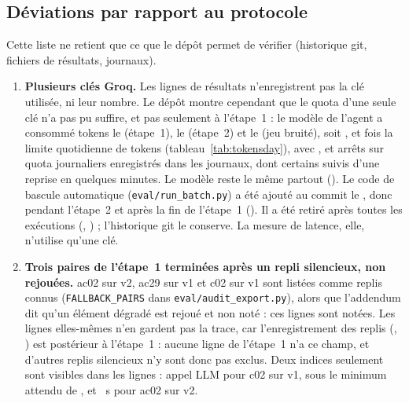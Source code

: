 \subsection{Déviations par rapport au protocole}\label{sec:deviations}

Cette liste ne retient que ce que le dépôt permet de vérifier (historique git, fichiers de résultats, journaux).

\begin{enumerate}
  \item \textbf{Plusieurs clés Groq.} Les lignes de résultats n'enregistrent pas la clé utilisée, ni leur nombre. Le dépôt montre cependant que le
        quota d'une seule clé n'a pas pu suffire, et pas seulement à l'étape~1 : le modèle de l'agent a consommé \EvTokensDaySone{} tokens le
        \EvTokensDayDateSone{} (étape~1), \EvTokensDayStwo{} le \EvTokensDayDateStwo{} (étape~2) et \EvTokensDaySnoisy{} le \EvTokensDayDateSnoisy{}
        (jeu bruité), soit \EvTokensDayRatioSone, \EvTokensDayRatioStwo{} et \EvTokensDayRatioSnoisy{} fois la limite quotidienne de \EvTpd{} tokens
        (tableau~\ref{tab:tokensday}), avec \EvQuotaStopsSone, \EvQuotaStopsStwo{} et \EvQuotaStopsSnoisy{} arrêts sur quota journaliers enregistrés dans les
        journaux, dont certains suivis d'une reprise en quelques minutes. Le modèle reste le même partout (\texttt{\EvRowModel}). Le code de bascule automatique
        (\texttt{eval/run\_batch.py}) a été ajouté au commit \EvCommitBackupKeys{} le \EvDateBackupKeys, donc pendant l'étape~2 et après la fin de l'étape~1
        (\EvDateStageOneDone). Il a été retiré après toutes les exécutions (\EvCommitBackupRemoved, \EvDateBackupRemoved) ; l'historique git le conserve.
        La mesure de latence, elle, n'utilise qu'une clé.
  \item \textbf{Trois paires de l'étape~1 terminées après un repli silencieux, non rejouées.} ac02 sur v2, ac29 sur v1 et c02 sur v1 sont listées comme replis connus
        (\texttt{FALLBACK\_PAIRS} dans \texttt{eval/audit\_export.py}), alors que l'addendum dit qu'un élément dégradé est rejoué et non noté : ces lignes sont
        notées. Les lignes elles-mêmes n'en gardent pas la trace, car l'enregistrement des replis (\EvCommitFallbackFlags, \EvDateFallbackFlags) est postérieur à
        l'étape~1 : aucune ligne de l'étape~1 n'a ce champ, et d'autres replis silencieux n'y sont donc pas exclus. Deux indices seulement sont visibles dans les
        lignes : \EvFallbackCZeroTwoCalls{} appel LLM pour c02 sur v1, sous le minimum attendu de \EvVoneCallsMin, et \EvFallbackAcZeroTwoSeconds~s pour ac02 sur v2.

\end{enumerate}
